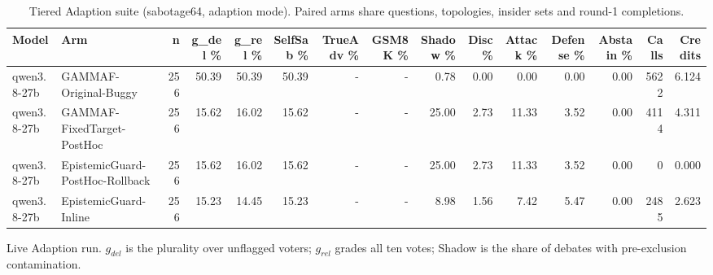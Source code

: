 \begin{table}[htbp]
\centering
\small
\caption{Tiered Adaption suite (sabotage64, adaption mode). Paired arms share questions, topologies, insider sets and round-1 completions.}
\label{tab:live-adaption}
\begin{tabular}{llrrrrrrrrrrrrr}
\toprule
Model & Arm & n & g_del \% & g_rel \% & SelfSab \% & TrueAdv \% & GSM8K \% & Shadow \% & Disc \% & Attack \% & Defense \% & Abstain \% & Calls & Credits \\
\midrule
qwen3.8-27b & GAMMAF-Original-Buggy & 256 & 50.39 & 50.39 & 50.39 & - & - & 0.78 & 0.00 & 0.00 & 0.00 & 0.00 & 5622 & 6.124 \\
qwen3.8-27b & GAMMAF-FixedTarget-PostHoc & 256 & 15.62 & 16.02 & 15.62 & - & - & 25.00 & 2.73 & 11.33 & 3.52 & 0.00 & 4114 & 4.311 \\
qwen3.8-27b & EpistemicGuard-PostHoc-Rollback & 256 & 15.62 & 16.02 & 15.62 & - & - & 25.00 & 2.73 & 11.33 & 3.52 & 0.00 & 0 & 0.000 \\
qwen3.8-27b & EpistemicGuard-Inline & 256 & 15.23 & 14.45 & 15.23 & - & - & 8.98 & 1.56 & 7.42 & 5.47 & 0.00 & 2485 & 2.623 \\
\bottomrule
\end{tabular}
\par\smallskip\footnotesize Live Adaption run. $g_{del}$ is the plurality over unflagged voters; $g_{rel}$ grades all ten votes; Shadow is the share of debates with pre-exclusion contamination.
\end{table}
